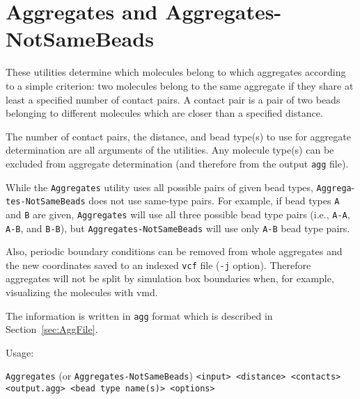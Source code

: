 \section{Aggregates and Aggregates-NotSameBeads} \label{sec:Aggregates}

These utilities determine which molecules belong to which aggregates
according to a simple criterion: two molecules belong to the same aggregate
if they share at least a specified number of contact pairs. A contact pair
is a pair of two beads belonging to different molecules which are closer
than a specified distance.

The number of contact pairs, the distance, and bead type(s) to use for
aggregate determination are all arguments of the utilities.  Any molecule
type(s) can be excluded from aggregate determination (and therefore from
the output \texttt{agg} file).

While the \texttt{Aggregates} utility uses all possible pairs of given bead
types, \texttt{Aggrega}-\texttt{tes-NotSameBeads} does not use same-type pairs. For
example, if bead types \texttt{A} and \texttt{B} are given,
\texttt{Aggregates} will use all three possible bead type pairs (i.e.,
\texttt{A-A}, \texttt{A-B}, and \texttt{B-B}), but
\texttt{Aggregates-NotSameBeads} will use only \texttt{A-B} bead type
pairs.

Also, periodic boundary conditions can be removed from whole aggregates and
the new coordinates saved to an indexed \texttt{vcf} file (\texttt{-j}
option). Therefore aggregates will not be split by simulation box
boundaries when, for example, visualizing the molecules with vmd.

The information is written in \texttt{agg} format which is described in
Section~\ref{sec:AggFile}.

Usage:

\noindent
\vspace{1em}
\texttt{Aggregates} (or \texttt{Aggregates-NotSameBeads}) \texttt{<input>
<distance> <contacts> <output.agg> <bead type name(s)> <options>}

